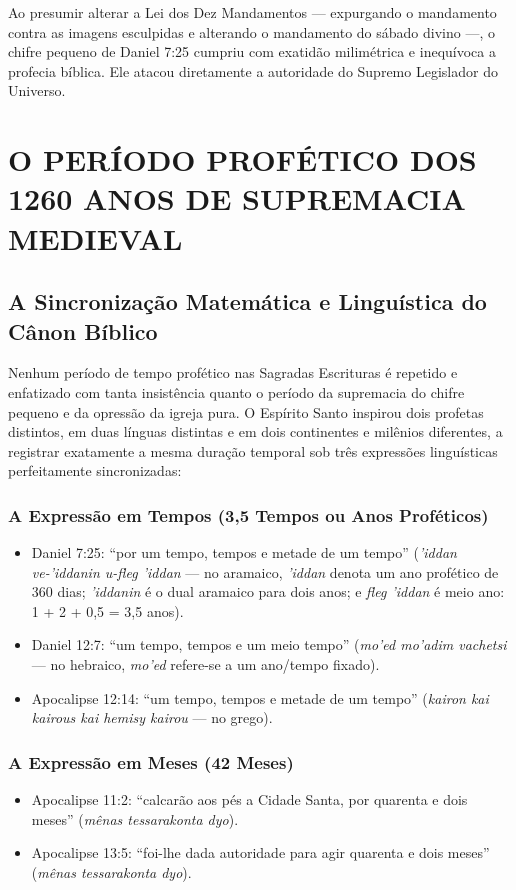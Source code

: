\documentclass[11pt,a4paper,openany]{book}
\begin{document}
Ao presumir alterar a Lei dos Dez Mandamentos — expurgando o mandamento contra as imagens esculpidas e alterando o mandamento do sábado divino —, o chifre pequeno de Daniel 7:25 cumpriu com exatidão milimétrica e inequívoca a profecia bíblica. Ele atacou diretamente a autoridade do Supremo Legislador do Universo.



\section{O PERÍODO PROFÉTICO DOS 1260 ANOS DE SUPREMACIA MEDIEVAL}



\subsection{A Sincronização Matemática e Linguística do Cânon Bíblico}


Nenhum período de tempo profético nas Sagradas Escrituras é repetido e enfatizado com tanta insistência quanto o período da supremacia do chifre pequeno e da opressão da igreja pura. O Espírito Santo inspirou dois profetas distintos, em duas línguas distintas e em dois continentes e milênios diferentes, a registrar exatamente a mesma duração temporal sob três expressões linguísticas perfeitamente sincronizadas:


\subsubsection*{A Expressão em Tempos (3,5 Tempos ou Anos Proféticos)}
\begin{itemize}
  \item Daniel 7:25: ``por um tempo, tempos e metade de um tempo'' (\textit{'iddan ve-'iddanin u-fleg 'iddan} — no aramaico, \textit{'iddan} denota um ano profético de 360 dias; \textit{'iddanin} é o dual aramaico para dois anos; e \textit{fleg 'iddan} é meio ano: 1 + 2 + 0,5 = 3,5 anos).
  \item Daniel 12:7: ``um tempo, tempos e um meio tempo'' (\textit{mo'ed mo'adim vachetsi} — no hebraico, \textit{mo'ed} refere-se a um ano/tempo fixado).
  \item Apocalipse 12:14: ``um tempo, tempos e metade de um tempo'' (\textit{kairon kai kairous kai hemisy kairou} — no grego).
\end{itemize}



\subsubsection*{A Expressão em Meses (42 Meses)}
\begin{itemize}
  \item Apocalipse 11:2: ``calcarão aos pés a Cidade Santa, por quarenta e dois meses'' (\textit{mênas tessarakonta dyo}).
  \item Apocalipse 13:5: ``foi-lhe dada autoridade para agir quarenta e dois meses'' (\textit{mênas tessarakonta dyo}).
\end{itemize}
\end{document}
